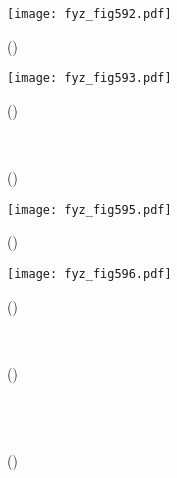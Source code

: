     \begin{figure}[ht!] %
      \centering
      \texttt{[image: fyz\_fig592.pdf]}
      \caption{
               (\cite[s.~707]{Feynman02})}
      \label{fyz:fig592}
    \end{figure}

    \begin{figure}[ht!] %
      \centering
      \texttt{[image: fyz\_fig593.pdf]}
      \caption{
               (\cite[s.~707]{Feynman02})}
      \label{fyz:fig593}
    \end{figure}

    \begin{figure}[ht!]
      \centering
                     \\
      \caption{
               (\cite[s.~748]{Feynman02})}
    \end{figure}

    \begin{figure}[ht!] %
      \centering
      \texttt{[image: fyz\_fig595.pdf]}
      \caption{
               (\cite[s.~707]{Feynman02})}
      \label{fyz:fig595}
    \end{figure}

    \begin{figure}[ht!] %
      \centering
      \texttt{[image: fyz\_fig596.pdf]}
      \caption{
               (\cite[s.~707]{Feynman02})}
      \label{fyz:fig596}
    \end{figure}

    \begin{figure}[ht!]
      \centering
                     \\
      \caption{
               (\cite[s.~748]{Feynman02})}
      \label{fyz:fig597}
    \end{figure}

    \begin{figure}[ht!]
      \centering
                     \\
                     \\
      \caption{
               (\cite[s.~748]{Feynman02})}
      \label{fyz:fig598}
    \end{figure}

